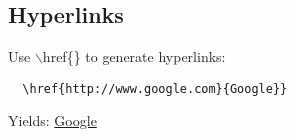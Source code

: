 

\newpage
\subsection{Hyperlinks}
Use $\backslash$href\{\} to generate hyperlinks:

\begin{verbatim}
  \href{http://www.google.com}{Google}}
\end{verbatim}

\noindent Yields: \href{http://www.google.com}{Google}
